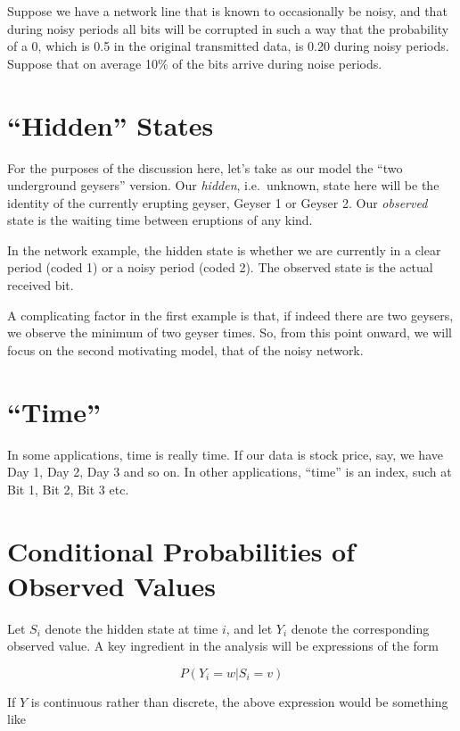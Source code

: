 \documentclass[11pt]{article}
\begin{document}
Suppose we have a network line that is known to occasionally be
noisy, and that during noisy periods all bits will be corrupted in such
a way that the probability of a 0, which is 0.5 in the original
transmitted data, is 0.20 during noisy periods.  Suppose that on average
10\% of the bits arrive during noise periods.

\section{``Hidden'' States}

For the purposes of the discussion here, let's take as our model the
``two underground geysers'' version.  Our \textit{hidden}, i.e.\ unknown, state
here will be the identity of the currently erupting geyser, Geyser 1 or
Geyser 2.  Our \textit{observed} state is the waiting time between
eruptions of any kind.

In the network example, the hidden state is whether we are currently in
a clear period (coded 1) or a noisy period (coded 2).  The observed
state is the actual received bit.

A complicating factor in the first example is that, if indeed there are
two geysers, we observe the minimum of two geyser times.  So,
from this point onward, we will focus on the second motivating model,
that of the noisy network.

\section{``Time''}

In some applications, time is really time.  If our data is stock price,
say, we have Day 1, Day 2, Day 3 and so on.  In other applications,
``time'' is an index, such at Bit 1, Bit 2, Bit 3 etc.

\section{Conditional Probabilities of Observed Values}

Let $S_i$ denote the hidden state at time $i$, 
and let $Y_i$ denote the corresponding observed value.  A key ingredient
in the analysis will be expressions of the form

\begin{equation}
P(Y_i = w | S _i = v)
\end{equation}

If $Y$ is continuous rather than discrete, the above expression would be
something like
\end{document}
